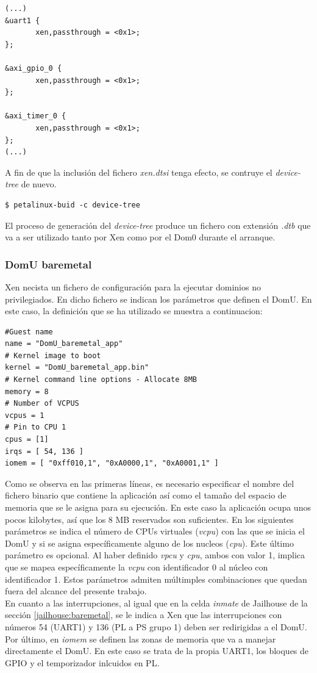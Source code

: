 \begin{lstlisting}[style=CStyle]
(...)
&uart1 {
       xen,passthrough = <0x1>;
};

&axi_gpio_0 {
       xen,passthrough = <0x1>;
};

&axi_timer_0 {
       xen,passthrough = <0x1>;
};
(...)
\end{lstlisting}

A fin de que la inclusión del fichero \textit{xen.dtsi} tenga efecto, se contruye el \textit{device-tree} de nuevo.

\begin{lstlisting}[style=CStyle]
$ petalinux-buid -c device-tree
\end{lstlisting}

El proceso de generación del \textit{device-tree} produce un fichero con extensión \textit{.dtb} que va a ser utilizado tanto por Xen como por el Dom0 durante el arranque.

\subsubsection{DomU baremetal}

Xen necista un fichero de configuración para la ejecutar dominios no privilegiados. En dicho fichero se indican los parámetros que definen el DomU. En este caso, la definición que se ha utilizado se muestra a continuacion:

\begin{lstlisting}[style=CStyle]
#Guest name
name = "DomU_baremetal_app"
# Kernel image to boot
kernel = "DomU_baremetal_app.bin"
# Kernel command line options - Allocate 8MB
memory = 8
# Number of VCPUS
vcpus = 1
# Pin to CPU 1
cpus = [1]
irqs = [ 54, 136 ]
iomem = [ "0xff010,1", "0xA0000,1", "0xA0001,1" ]
\end{lstlisting}

Como se observa en las primeras líneas, es necesario especificar el nombre del fichero binario que contiene la aplicación así como el tamaño del espacio de memoria que se le asigna para su ejecución. En este caso la aplicación ocupa unos pocos kilobytes, así que los 8 MB reservados son suficientes. En los siguientes parámetros se indica el número de CPUs virtuales (\textit{vcpu}) con las que se inicia el DomU y si se asigna específicamente alguno de los nucleos (\textit{cpu}). Este último parámetro es opcional. Al haber definido \textit{vpcu} y \textit{cpu}, ambos con valor 1, implica que se mapea específicamente la \textit{vcpu} con identificador 0 al núcleo con identificador 1. Estos parámetros admiten múltimples combinaciones que quedan fuera del alcance del presente trabajo.\\
En cuanto a las interrupciones, al igual que en la celda \textit{inmate} de Jailhouse de la sección \ref{jailhouse:baremetal}, se le indica a Xen que las interrupciones con números 54 (\acrshort{UART}1) y 136 (\acrshort{PL} a \acrshort{PS} grupo 1) deben ser redirigidas a el DomU.\\
Por último, en \textit{iomem} se definen las zonas de memoria que va a manejar directamente el DomU. En este caso se trata de la propia \acrshort{UART}1, los bloques de \acrshort{GPIO} y el temporizador inlcuidos en \acrshort{PL}.

